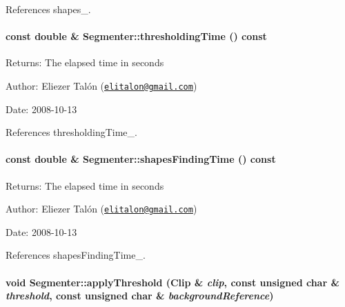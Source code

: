 References shapes\_\-.\hypertarget{class_segmenter_52f771c61d667df4f552ee73dc9f22e7}{
\paragraph[thresholdingTime]{\setlength{\rightskip}{0pt plus 5cm}const double \& Segmenter::thresholdingTime () const}\hfill}
\label{class_segmenter_52f771c61d667df4f552ee73dc9f22e7}


\begin{Desc}
\item[Returns:]The elapsed time in seconds\end{Desc}
\begin{Desc}
\item[Author:]Eliezer Talón (\href{mailto:elitalon@gmail.com}{\tt elitalon@gmail.com}) \end{Desc}
\begin{Desc}
\item[Date:]2008-10-13 \end{Desc}


References thresholdingTime\_\-.\hypertarget{class_segmenter_53761a65661587c45e34988b90401888}{
\paragraph[shapesFindingTime]{\setlength{\rightskip}{0pt plus 5cm}const double \& Segmenter::shapesFindingTime () const}\hfill}
\label{class_segmenter_53761a65661587c45e34988b90401888}


\begin{Desc}
\item[Returns:]The elapsed time in seconds\end{Desc}
\begin{Desc}
\item[Author:]Eliezer Talón (\href{mailto:elitalon@gmail.com}{\tt elitalon@gmail.com}) \end{Desc}
\begin{Desc}
\item[Date:]2008-10-13 \end{Desc}


References shapesFindingTime\_\-.\hypertarget{class_segmenter_6854315e3320f9d9a8ece14cbb8570ee}{
\paragraph[applyThreshold]{\setlength{\rightskip}{0pt plus 5cm}void Segmenter::applyThreshold ({\bf Clip} \& {\em clip}, \/  const unsigned char \& {\em threshold}, \/  const unsigned char \& {\em backgroundReference})}\hfill}
\label{class_segmenter_6854315e3320f9d9a8ece14cbb8570ee}


